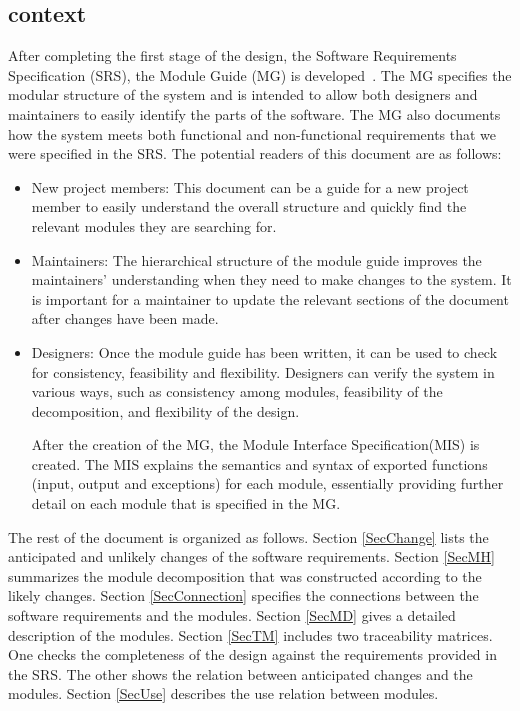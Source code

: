 \documentclass[12pt, titlepage]{article}
\begin{document}
\subsection{context}

After completing the first stage of the design, the Software Requirements
Specification (SRS), the Module Guide (MG) is developed~\citep{ParnasEtAl1984}. The MG
specifies the modular structure of the system and is intended to allow both
designers and maintainers to easily identify the parts of the software. The MG also documents how the system meets both functional and non-functional requirements that we were specified in the SRS. The
potential readers of this document are as follows:

\begin{itemize}
\item New project members: This document can be a guide for a new project member
  to easily understand the overall structure and quickly find the
  relevant modules they are searching for.
\item Maintainers: The hierarchical structure of the module guide improves the
  maintainers' understanding when they need to make changes to the system. It is
  important for a maintainer to update the relevant sections of the document
  after changes have been made.
\item Designers: Once the module guide has been written, it can be used to
  check for consistency, feasibility and flexibility. Designers can verify the
  system in various ways, such as consistency among modules, feasibility of the
  decomposition, and flexibility of the design.~\citep{Bokahari2018}

After the creation of the MG, the Module Interface Specification(MIS) is created. The MIS explains the semantics and syntax of exported functions (input, output and exceptions) for each module, essentially providing further detail on each module that is specified in the MG.~\citep{calce_fenster_tatasciore_2016}
\end{itemize}

The rest of the document is organized as follows. Section
\ref{SecChange} lists the anticipated and unlikely changes of the software
requirements. Section \ref{SecMH} summarizes the module decomposition that
was constructed according to the likely changes. Section \ref{SecConnection}
specifies the connections between the software requirements and the
modules. Section \ref{SecMD} gives a detailed description of the
modules. Section \ref{SecTM} includes two traceability matrices. One checks
the completeness of the design against the requirements provided in the SRS. The
other shows the relation between anticipated changes and the modules. Section
\ref{SecUse} describes the use relation between modules.
\end{document}
